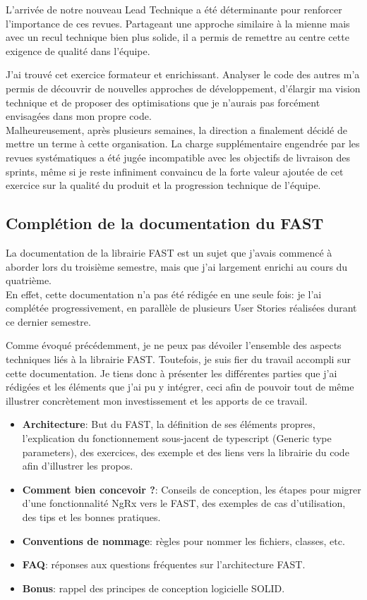 \documentclass{article}
\begin{document}
L'arrivée de notre nouveau Lead Technique a été déterminante pour renforcer l'importance de ces revues. Partageant une approche similaire à la mienne mais avec un recul technique bien plus solide, il a permis de remettre au centre cette exigence de qualité dans l'équipe.

J'ai trouvé cet exercice formateur et enrichissant. Analyser le code des autres m'a permis de découvrir de nouvelles approches de développement, d'élargir ma vision technique et de proposer des optimisations que je n'aurais pas forcément envisagées dans mon propre code. \\

Malheureusement, après plusieurs semaines, la direction a finalement décidé de mettre un terme à cette organisation. La charge supplémentaire engendrée par les revues systématiques a été jugée incompatible avec les objectifs de livraison des sprints, même si je reste infiniment convaincu de la forte valeur ajoutée de cet exercice sur la qualité du produit et la progression technique de l'équipe.

\subsection{ Complétion de la documentation du FAST}

La documentation de la librairie FAST est un sujet que j'avais commencé à aborder lors du troisième semestre, mais que j'ai largement enrichi au cours du quatrième. \\

En effet, cette documentation n'a pas été rédigée en une seule fois: je l'ai complétée progressivement, en parallèle de plusieurs User Stories réalisées durant ce dernier semestre.

Comme évoqué précédemment, je ne peux pas dévoiler l'ensemble des aspects techniques liés à la librairie FAST. Toutefois, je suis fier du travail accompli sur cette documentation. Je tiens donc à présenter les différentes parties que j'ai rédigées et les éléments que j'ai pu y intégrer, ceci afin de pouvoir tout de même illustrer concrètement mon investissement et les apports de ce travail.

\begin{itemize}
    \item \textbf{Architecture}: But du FAST, la définition de ses éléments propres, l'explication du fonctionnement sous-jacent de typescript (Generic type parameters), des exercices, des exemple et des liens vers la librairie du code afin d'illustrer les propos.
    \item \textbf{Comment bien concevoir ?}: Conseils de conception, les étapes pour migrer d'une fonctionnalité NgRx vers le FAST, des exemples de cas d'utilisation, des tips et les bonnes pratiques.
    \item \textbf{Conventions de nommage}: règles pour nommer les fichiers, classes, etc.
    \item \textbf{FAQ}: réponses aux questions fréquentes sur l'architecture FAST.
    \item \textbf{Bonus}: rappel des principes de conception logicielle SOLID. \\
\end{itemize}
\end{document}
